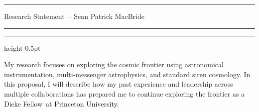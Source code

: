 \documentclass[11pt]{article}
\newcommand{\tcolor}{black}
\newcommand{\yourname}{Sean Patrick MacBride}
\newcommand{\soptitle}{Research Statement}
\newcommand{\Institute}{\textcolor{\tcolor}{Princeton University}}
\newcommand{\Position}{\textcolor{\tcolor}{Dicke Fellow}}
\begin{document}
\hrule
\begin{center}
    \Large\soptitle\ -- \yourname
\end{center}
\vspace{0pt}
\hrule
\vspace{0.5pt}
\hrule height 0.5pt
\vspace{3pt}

\normalsize
\noindent My research focuses on exploring the cosmic frontier using astronomical instrumentation, multi-messenger astrophysics, and standard siren cosmology.
In this proposal, I will describe how my past experience and leadership across multiple collaborations has prepared me to continue exploring the frontier as a \Position\ at \Institute.

  
\end{document}
